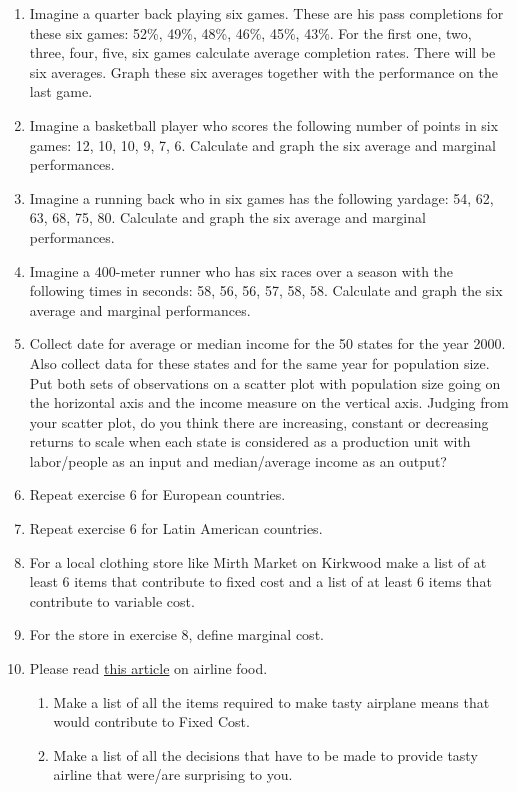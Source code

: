 \documentclass[
]{book}
\providecommand{\tightlist}{%
  \setlength{\itemsep}{0pt}\setlength{\parskip}{0pt}}
\begin{document}
\begin{enumerate}
\def\labelenumi{\arabic{enumi}.}
\item
  Imagine a quarter back playing six games. These are his pass completions for these six games: 52\%, 49\%, 48\%, 46\%, 45\%, 43\%. For the first one, two, three, four, five, six games calculate average completion rates. There will be six averages. Graph these six averages together with the performance on the last game.
\item
  Imagine a basketball player who scores the following number of points in six games: 12, 10, 10, 9, 7, 6. Calculate and graph the six average and marginal performances.
\item
  Imagine a running back who in six games has the following yardage: 54, 62, 63, 68, 75, 80. Calculate and graph the six average and marginal performances.
\item
  Imagine a 400-meter runner who has six races over a season with the following times in seconds: 58, 56, 56, 57, 58, 58. Calculate and graph the six average and marginal performances.
\item
  Collect date for average or median income for the 50 states for the year 2000. Also collect data for these states and for the same year for population size. Put both sets of observations on a scatter plot with population size going on the horizontal axis and the income measure on the vertical axis. Judging from your scatter plot, do you think there are increasing, constant or decreasing returns to scale when each state is considered as a production unit with labor/people as an input and median/average income as an output?
\item
  Repeat exercise 6 for European countries.
\item
  Repeat exercise 6 for Latin American countries.
\item
  For a local clothing store like Mirth Market on Kirkwood make a list of at least 6 items that contribute to fixed cost and a list of at least 6 items that contribute to variable cost.
\item
  For the store in exercise 8, define marginal cost.
\item
  Please read \href{https://www.nytimes.com/2022/12/30/business/gate-gourmet-airline-food.html}{this article} on airline food.

  \begin{enumerate}
  \def\labelenumii{\alph{enumii}.}
  \tightlist
  \item
    Make a list of all the items required to make tasty airplane means that would contribute to Fixed Cost.
  \item
    Make a list of all the decisions that have to be made to provide tasty airline that were/are surprising to you.
  \end{enumerate}
\end{enumerate}
\end{document}
